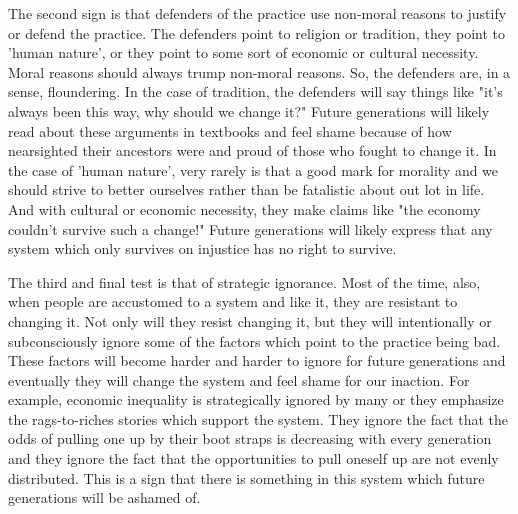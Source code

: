 The second sign is that defenders of the practice use non-moral reasons to justify or defend the practice. The defenders point to religion or tradition, they point to 'human nature', or they point to some sort of economic or cultural necessity. Moral reasons should always trump non-moral reasons. So, the defenders are, in a sense, floundering. In the case of tradition, the defenders will say things like "it's always been this way, why should we change it?" Future generations will likely read about these arguments in textbooks and feel shame because of how nearsighted their ancestors were and proud of those who fought to change it. In the case of  'human nature', very rarely is that a good mark for morality and we should strive to better ourselves rather than be fatalistic about out lot in life. And with cultural or economic necessity, they make claims like "the economy couldn't survive such a change!" Future generations will likely express that any system which only survives on injustice has no right to survive. 

The third and final test is that of strategic ignorance. Most of the time, also, when people are accustomed to a system and like it, they are resistant to changing it. Not only will they resist changing it, but they will intentionally or subconsciously ignore some of the factors which point to the practice being bad. These factors will become harder and harder to ignore for future generations and eventually they will change the system and feel shame for our inaction. For example, economic inequality is strategically ignored by many or they emphasize the rags-to-riches stories which support the system. They ignore the fact that the odds of pulling one up by their boot straps is decreasing with every generation and they ignore the fact that the opportunities to pull oneself up are not evenly distributed. This is a sign that there is something in this system which future generations will be ashamed of.